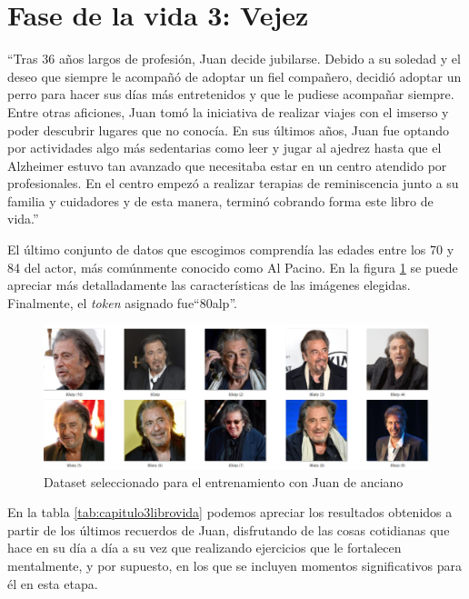 \section{Fase de la vida 3: Vejez}
``Tras 36 años largos de profesión, Juan decide jubilarse. Debido a su soledad y el deseo que siempre le acompañó de adoptar un fiel compañero, decidió adoptar un perro para hacer sus días más entretenidos y que le pudiese acompañar siempre. Entre otras aficiones, Juan tomó la iniciativa de realizar viajes con el imserso y poder descubrir lugares que no conocía. En sus últimos años, Juan fue optando por actividades algo más sedentarias como leer y jugar al ajedrez hasta que el Alzheimer estuvo tan avanzado que necesitaba estar en un centro atendido por profesionales. En el centro empezó a realizar terapias de reminiscencia junto a su familia y cuidadores y de esta manera, terminó cobrando forma este libro de vida.'' 

El último conjunto de datos que escogimos comprendía las edades entre los 70 y 84 del actor, más comúnmente conocido como Al Pacino. En la figura \ref{fig:dataset80alp} se puede apreciar más detalladamente las características de las imágenes elegidas. Finalmente, el \textit{token} asignado fue``80alp''. \\

\begin{figure}[!htb]
	\centering
	\includegraphics[width = 1
	\textwidth]{Imagenes/Vectorial/dataset_80alp.png}
	\caption{Dataset seleccionado para el entrenamiento con Juan de anciano}
	\label{fig:dataset80alp}
\end{figure}

En la tabla \ref*{tab:capitulo3librovida} podemos apreciar los resultados obtenidos a partir de los últimos recuerdos de Juan, disfrutando de las cosas cotidianas que hace en su día a día a su vez que realizando ejercicios que le fortalecen mentalmente, y por supuesto, en los que se incluyen momentos significativos para él en esta etapa. \\



